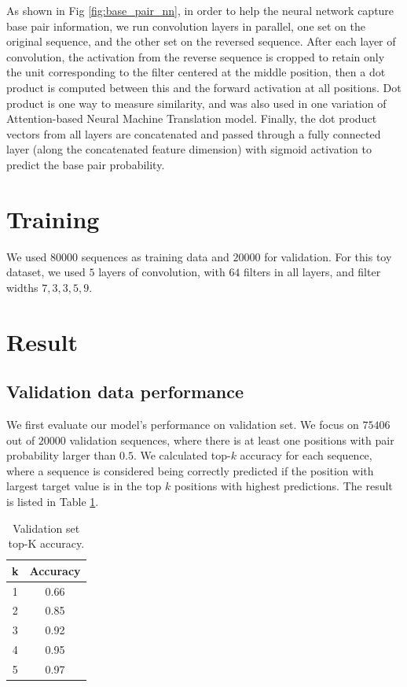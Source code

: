\documentclass{proposal}
\begin{document}
As shown in Fig \ref{fig:base_pair_nn}, in order to help the neural network capture base pair information,
we run convolution layers in parallel, one set on the original sequence, and the other set on the reversed sequence.
After each layer of convolution, the activation from the reverse sequence is
cropped to retain only the unit corresponding to the filter centered at the middle position,
then a dot product is computed between this and the forward activation at all positions.
Dot product is one way to measure similarity, and was also used in one variation of Attention-based Neural Machine Translation model\cite{luong2015effective}.
Finally, the dot product vectors from all layers are concatenated and passed
through a fully connected layer (along the concatenated feature dimension) with sigmoid activation to predict the base pair probability.

\section{Training}

We used $80000$ sequences as training data and $20000$ for validation.
For this toy dataset, we used $5$ layers of convolution, with $64$ filters in all layers,
and filter widths $7, 3, 3, 5, 9$.


\section{Result}

\subsection{Validation data performance}

We first evaluate our model's performance on validation set.
We focus on $75406$ out of $20000$ validation sequences, where there
is at least one positions with pair probability larger than $0.5$.
We calculated top-$k$ accuracy for each sequence,
where a sequence is considered being correctly predicted if the
position with largest target value is in the top $k$ positions with highest predictions.
The result is listed in Table \ref{table:base_pair_validation_performance}.

\begin{table}[h!]
    \centering
    \begin{tabular}{||c c||}
        \hline
        k & Accuracy \\ [0.5ex]
        \hline\hline
        1 & 0.66 \\
        \hline
        2 & 0.85 \\
        \hline
        3 & 0.92 \\
        \hline
        4 & 0.95 \\
        \hline
        5 & 0.97 \\
        \hline
    \end{tabular}
    \caption{Validation set top-K accuracy.}
    \label{table:base_pair_validation_performance}
\end{table}
\end{document}
